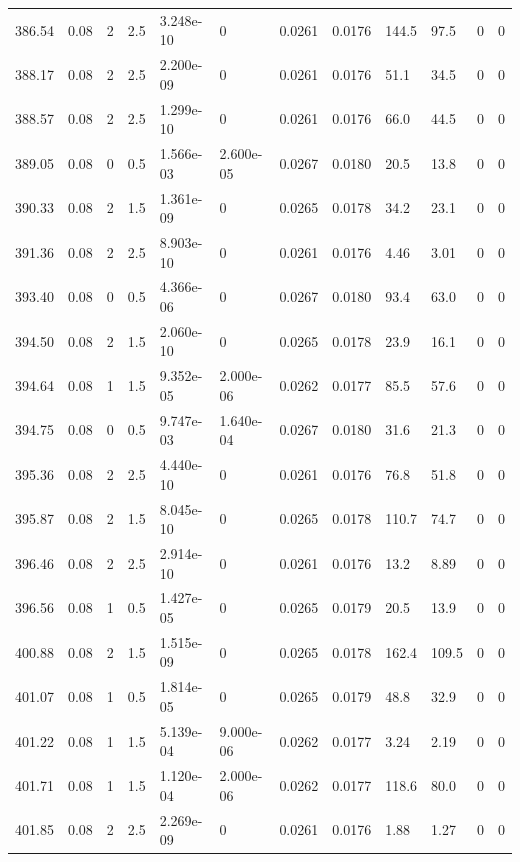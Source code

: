\documentclass[preview]{standalone}
\begin{document}
{{{{{{{\begin{tabular}{L{1.2cm}C{1.2cm} C{0.3cm}C{0.5cm} C{1.4cm}C{1.4cm} C{1.4cm}C{1.4cm} C{1.6cm}C{1.6cm} C{1.6cm}C{1.6cm}}
  386.54  &  0.08  & 2     & 2.5 &  3.248e-10  & 0  &  0.0261&   0.0176& 144.5 & 97.5   &  0 & 0  \\ 
  388.17  &  0.08  & 2     & 2.5 &  2.200e-09  & 0  &  0.0261&   0.0176& 51.1 & 34.5   &  0 & 0  \\ 
  388.57  &  0.08  & 2     & 2.5 &  1.299e-10  & 0  &  0.0261&   0.0176& 66.0 & 44.5   &  0 & 0  \\ 
  389.05  &  0.08  & 0     & 0.5 &  1.566e-03  & 2.600e-05  &  0.0267&   0.0180& 20.5 & 13.8   &  0 & 0  \\ 
  390.33  &  0.08  & 2     & 1.5 &  1.361e-09  & 0  &  0.0265&   0.0178& 34.2 & 23.1   &  0 & 0  \\ 
  391.36  &  0.08  & 2     & 2.5 &  8.903e-10  & 0  &  0.0261&   0.0176& 4.46 & 3.01   &  0 & 0  \\ 
  393.40  &  0.08  & 0     & 0.5 &  4.366e-06  & 0  &  0.0267&   0.0180& 93.4 & 63.0   &  0 & 0  \\ 
  394.50  &  0.08  & 2     & 1.5 &  2.060e-10  & 0  &  0.0265&   0.0178& 23.9 & 16.1   &  0 & 0  \\ 
  394.64  &  0.08  & 1     & 1.5 &  9.352e-05  & 2.000e-06  &  0.0262&   0.0177& 85.5 & 57.6   &  0 & 0  \\ 
  394.75  &  0.08  & 0     & 0.5 &  9.747e-03  & 1.640e-04  &  0.0267&   0.0180& 31.6 & 21.3   &  0 & 0  \\ 
  395.36  &  0.08  & 2     & 2.5 &  4.440e-10  & 0  &  0.0261&   0.0176& 76.8 & 51.8   &  0 & 0  \\ 
  395.87  &  0.08  & 2     & 1.5 &  8.045e-10  & 0  &  0.0265&   0.0178& 110.7 & 74.7   &  0 & 0  \\ 
  396.46  &  0.08  & 2     & 2.5 &  2.914e-10  & 0  &  0.0261&   0.0176& 13.2 & 8.89   &  0 & 0  \\ 
  396.56  &  0.08  & 1     & 0.5 &  1.427e-05  & 0  &  0.0265&   0.0179& 20.5 & 13.9   &  0 & 0  \\ 
  400.88  &  0.08  & 2     & 1.5 &  1.515e-09  & 0  &  0.0265&   0.0178& 162.4 & 109.5   &  0 & 0  \\ 
  401.07  &  0.08  & 1     & 0.5 &  1.814e-05  & 0  &  0.0265&   0.0179& 48.8 & 32.9   &  0 & 0  \\ 
  401.22  &  0.08  & 1     & 1.5 &  5.139e-04  & 9.000e-06  &  0.0262&   0.0177& 3.24 & 2.19   &  0 & 0  \\ 
  401.71  &  0.08  & 1     & 1.5 &  1.120e-04  & 2.000e-06  &  0.0262&   0.0177& 118.6 & 80.0   &  0 & 0  \\ 
  401.85  &  0.08  & 2     & 2.5 &  2.269e-09  & 0  &  0.0261&   0.0176& 1.88 & 1.27   &  0 & 0  \\ 

\end{tabular}}}}}}}}
\end{document}
